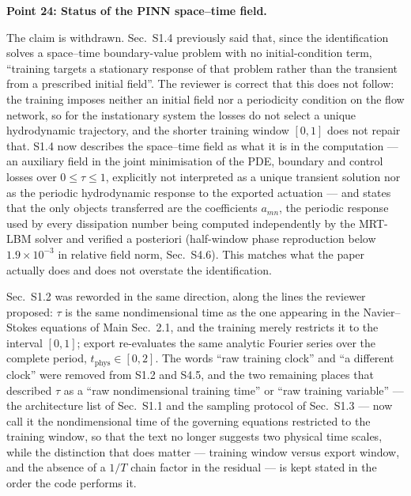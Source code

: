 \documentclass[11pt,a4paper]{article}
\begin{document}
\vspace{1em}

\noindent\textbf{Point 24: Status of the PINN space--time field.}

The claim is withdrawn. Sec.~S1.4 previously said that, since the identification
solves a space--time boundary-value problem with no initial-condition term,
``training targets a stationary response of that problem rather than the transient
from a prescribed initial field''. The reviewer is correct that this does not
follow: the training imposes neither an initial field nor a periodicity condition on
the flow network, so for the instationary system the losses do not select a unique
hydrodynamic trajectory, and the shorter training window $[0,1]$ does not repair
that. S1.4 now describes the space--time field as what it is in the computation ---
an auxiliary field in the joint minimisation of the PDE, boundary and control losses
over $0\le\tau\le1$, explicitly not interpreted as a unique transient solution nor as
the periodic hydrodynamic response to the exported actuation --- and states that the
only objects transferred are the coefficients $a_{mn}$, the periodic response used by
every dissipation number being computed independently by the MRT-LBM solver and
verified a posteriori (half-window phase reproduction below $1.9\times10^{-3}$ in
relative field norm, Sec.~S4.6). This matches what the paper actually does and does
not overstate the identification.

Sec.~S1.2 was reworded in the same direction, along the lines the reviewer proposed:
$\tau$ is the same nondimensional time as the one appearing in the Navier--Stokes
equations of Main Sec.~2.1, and the training merely restricts it to the interval
$[0,1]$; export re-evaluates the same analytic Fourier series over the complete
period, $t_{\mathrm{phys}}\in[0,2]$. The words ``raw training clock'' and ``a
different clock'' were removed from S1.2 and S4.5, and the two remaining places that
described $\tau$ as a ``raw nondimensional training time'' or ``raw training
variable'' --- the architecture list of Sec.~S1.1 and the sampling protocol of
Sec.~S1.3 --- now call it the nondimensional time of the governing equations
restricted to the training window, so that the text no longer suggests
two physical time scales, while the distinction that does matter --- training window
versus export window, and the absence of a $1/T$ chain factor in the residual --- is
kept stated in the order the code performs it.

\vspace{1em}
\end{document}

